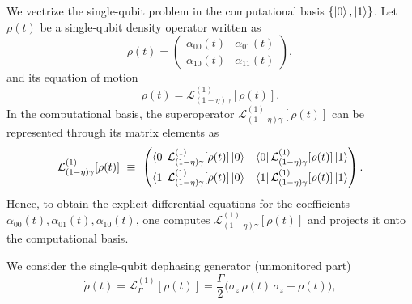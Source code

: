 We vectrize the single-qubit problem in the computational basis $\{\ket{0},\ket{1}\}$.
Let $\rho(t)$ be a single-qubit density operator written as
\begin{equation}
	\rho(t)=
	\begin{pmatrix}
		\alpha_{00}(t) & \alpha_{01}(t)\\
		\alpha_{10}(t) & \alpha_{11}(t)
	\end{pmatrix},
	\label{eq:rho_single_qubit_param}
\end{equation}
and its equation of motion
\begin{equation}
	\dot{\rho}(t)=\mathcal{L}^{(1)}_{(1-\eta)\gamma}\!\left[\rho(t)\right].
	\label{eq:single_qubit_ME_param}
\end{equation}
In the computational basis, the superoperator $\mathcal{L}^{(1)}_{(1-\eta)\gamma}[\rho(t)]$
can be represented through its matrix elements as
\begin{equation}
	\mathcal{L}^{(1)}_{(1-\eta)\gamma}\!\left[\rho(t)\right]
	\ \equiv\
	\begin{pmatrix}
		\bra{0}\mathcal{L}^{(1)}_{(1-\eta)\gamma}[\rho(t)]\ket{0}
		&
		\bra{0}\mathcal{L}^{(1)}_{(1-\eta)\gamma}[\rho(t)]\ket{1}
		\\[4pt]
		\bra{1}\mathcal{L}^{(1)}_{(1-\eta)\gamma}[\rho(t)]\ket{0}
		&
		\bra{1}\mathcal{L}^{(1)}_{(1-\eta)\gamma}[\rho(t)]\ket{1}
	\end{pmatrix}.
	\label{eq:Liouv_matrix_elements}
\end{equation}
Hence, to obtain the explicit differential equations for the coefficients
$\alpha_{00}(t),\alpha_{01}(t),\alpha_{10}(t)$, one computes
$\mathcal{L}^{(1)}_{(1-\eta)\gamma}[\rho(t)]$ and projects it onto the computational basis.

We consider the single-qubit dephasing generator (unmonitored part)
\begin{equation}
	\dot{\rho}(t)=\mathcal{L}^{(1)}_{\Gamma}[\rho(t)]
	=\frac{\Gamma}{2}\Big(\sigma_z\,\rho(t)\,\sigma_z-\rho(t)\Big),
\end{equation}

